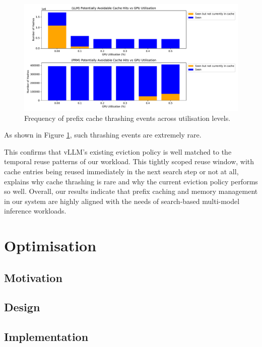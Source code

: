 \documentclass[12pt,twoside]{report}
\begin{document}
\begin{figure}[htbp]
\centering
\includegraphics[width=\textwidth]{figures/kv_thrashing_stats.pdf}
\caption{Frequency of prefix cache thrashing events across utilisation levels.}
\label{fig:cache_thrashing}
\end{figure}

As shown in Figure \ref{fig:cache_thrashing}, such thrashing events are extremely rare. 

This confirms that vLLM's existing eviction policy is well matched to the temporal reuse patterns of our workload.
This tightly scoped reuse window, with cache entries being reused immediately in the next search step or not at all, explains why cache thrashing is rare and why the current eviction policy performs so well. 
Overall, our results indicate that prefix caching and memory management in our system are highly aligned with the needs of search-based multi-model inference workloads.

\chapter{Optimisation}

\section{Motivation}
\section{Design}
\section{Implementation}
\end{document}
